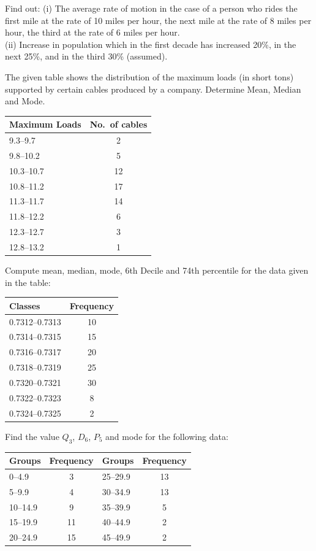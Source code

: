 \documentclass[11pt,a4paper]{article}
\begin{document}
\begin{longlist}
\item [35.] Find out: (i) The average rate of motion in the case of a person who rides the first mile at the rate of 10 miles per hour, the next mile at the rate of 8 miles per hour, the third at the rate of 6 miles per hour.\\
(ii) Increase in population which in the first decade has increased 20\%, in the next 25\%, and in the third 30\% (assumed).

\item The given table shows the distribution of the maximum loads (in short tons) supported by certain cables produced by a company. Determine Mean, Median and Mode.
\begin{center}
\begin{tabular}{lc}
Maximum Loads & No.\ of cables \\
\hline
9.3--9.7 & 2 \\
9.8--10.2 & 5 \\
10.3--10.7 & 12 \\
10.8--11.2 & 17 \\
11.3--11.7 & 14 \\
11.8--12.2 & 6 \\
12.3--12.7 & 3 \\
12.8--13.2 & 1
\end{tabular}
\end{center}

\item Compute mean, median, mode, 6th Decile and 74th percentile for the data given in the table:
\begin{center}
\begin{tabular}{lc}
Classes & Frequency \\
\hline
0.7312--0.7313 & 10 \\
0.7314--0.7315 & 15 \\
0.7316--0.7317 & 20 \\
0.7318--0.7319 & 25 \\
0.7320--0.7321 & 30 \\
0.7322--0.7323 & 8 \\
0.7324--0.7325 & 2
\end{tabular}
\end{center}

\item Find the value $Q_3$, $D_6$, $P_5$ and mode for the following data:
\begin{center}
\begin{tabular}{lc|lc}
Groups & Frequency & Groups & Frequency \\
\hline
0--4.9 & 3 & 25--29.9 & 13 \\
5--9.9 & 4 & 30--34.9 & 13 \\
10--14.9 & 9 & 35--39.9 & 5 \\
15--19.9 & 11 & 40--44.9 & 2 \\
20--24.9 & 15 & 45--49.9 & 2
\end{tabular}
\end{center}


\end{longlist}
\end{document}
